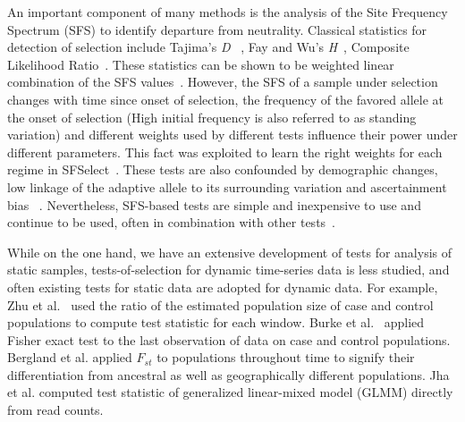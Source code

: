 \documentclass[11pt]{article}
\begin{document}
An important component of many methods is the analysis of the Site
Frequency Spectrum (SFS) to identify departure from
neutrality. Classical statistics for detection of selection include
Tajima's \emph{D} ~\cite{tajima1989statistical}, Fay and Wu's
\emph{H}~\cite{fay2000hitchhiking}, Composite Likelihood
Ratio~\cite{nielsen2005genomic}. These statistics can be shown to be
weighted linear combination of the SFS
values~\cite{achaz2009frequency}. However, the SFS of a sample under
selection changes with time since onset of selection, the frequency of
the favored allele at the onset of selection (High initial frequency
is also referred to as standing variation) and different weights used
by different tests influence their power under different
parameters. This fact was exploited to learn the right weights for
each regime in SFSelect~\cite{ronen2013learning}. These tests are also
confounded by demographic changes, low linkage of the adaptive allele
to its surrounding variation and ascertainment bias
~\cite{ptak2002evidence, ramos2002statistical,akey2009constructing,
  nielsen2003correcting,messer2013population}. Nevertheless, SFS-based
tests are simple and inexpensive to use and continue to be used, often
in combination with other
tests~\cite{akey2009constructing,vitti2013detecting}.


While on the one hand, we have an extensive development of tests for
analysis of static samples, tests-of-selection for dynamic time-series
data is less studied, and often existing tests for static data are
adopted for dynamic data. For example, Zhu et
al.~\cite{zhou2011experimental} used the ratio of the estimated
population size of case and control populations to compute test
statistic for each window.  Burke et al.~\cite{burke2010genome}
applied Fisher exact test to the last observation of data on case and
control populations.  Bergland et al. \cite{bergland2014genomic}
applied $F_{st}$ to populations throughout time to signify their
differentiation from ancestral as well as geographically different
populations.  Jha et al. \cite{jha2015whole} computed test statistic
of generalized linear-mixed model (GLMM) directly from read counts.
\end{document}
